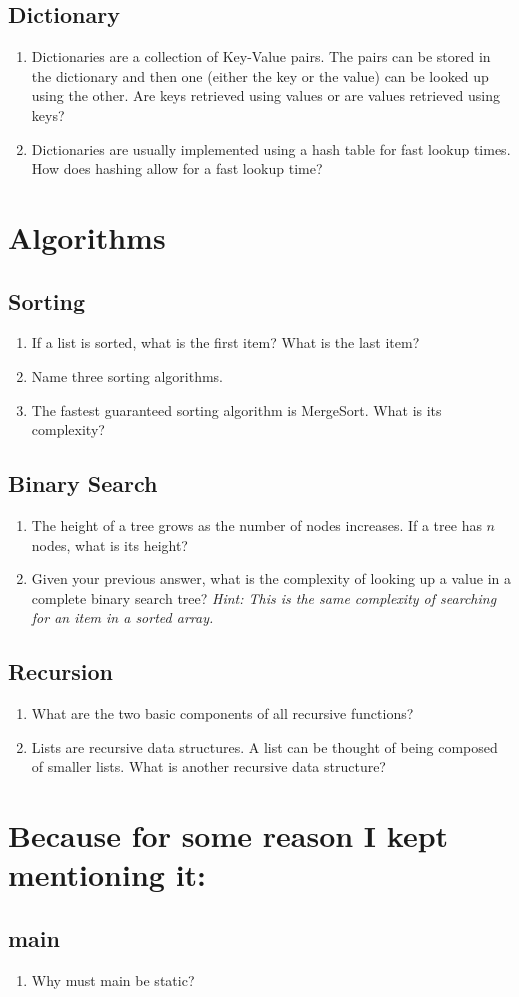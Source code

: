 \documentclass{article}
\begin{document}
	\subsection{Dictionary}
		\begin{enumerate}
			\item Dictionaries are a collection of Key-Value pairs.
			The pairs can be stored in the dictionary and then one
			(either the key or the value) can be looked up using
			the other. Are keys retrieved using values or are
			values retrieved using keys?
			\item Dictionaries are usually implemented using a hash
			table for fast lookup times. How does hashing allow for
			a fast lookup time?
		\end{enumerate}

\section{Algorithms}
	\subsection{Sorting}
		\begin{enumerate}
			\item If a list is sorted, what is the first item? What
			is the last item?
			\item Name three sorting algorithms.
			\item The fastest guaranteed sorting algorithm is
			MergeSort. What is its complexity?
		\end{enumerate}
	\subsection{Binary Search}
	\begin{enumerate}
		\item The height of a tree grows as the number of nodes
		increases. If a tree has $n$ nodes, what is its height?
		\item Given your previous answer, what is the complexity of
		looking up a value in a complete binary search tree?
		\emph{Hint: This is the same complexity of searching for an
		item in a sorted array.}
	\end{enumerate}
	\subsection{Recursion}
		\begin{enumerate}
			\item What are the two basic components of all
			recursive functions? 
			\item Lists are recursive data structures. A list can
			be thought of being composed of smaller lists. What is
			another recursive data structure?
		\end{enumerate}
\section{Because for some reason I kept mentioning it:}
\subsection{\var main}
\begin{enumerate}
	\item Why must \var main be static?
\end{enumerate}
\end{document}
